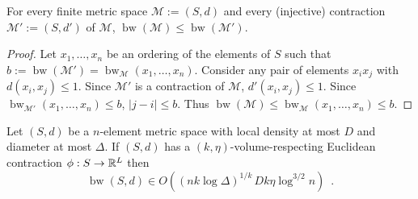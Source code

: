 \documentclass{patmorin}
\renewcommand{\ge}{\geqslant}
\renewcommand{\le}{\leqslant}
\newcommand{\david}[1]{{\color{orange} David: #1}}
\newcommand{\pat}[1]{\textcolor{Blue}{Pat: #1}}
\DeclareMathOperator{\bw}{bw}
\begin{document}

\begin{obs}\label{contraction_increases_bandwidth}
  For every finite metric space $\mathcal{M}:=(S,d)$ and every (injective) contraction $\mathcal{M}':=(S,d')$ of $\mathcal{M}$, $\bw(\mathcal{M}) \le \bw(\mathcal{M}')$.
\end{obs}

\begin{proof}
  Let $x_1,\ldots,x_n$ be an ordering of the elements of $S$ such that $b:=\bw(\mathcal{M}')=\bw_{\mathcal{M}}(x_1,\ldots,x_n)$. Consider any pair of elements $x_ix_j$ with $d(x_i,x_j) \le 1$. Since $\mathcal{M}'$ is a contraction of $\mathcal{M}$, $d'(x_i,x_j)\le 1$.  Since $\bw_{\mathcal{M}'}(x_1,\ldots,x_n)\le b$, $|j-i|\le b$.  Thus $\bw(\mathcal{M})\le \bw_{\mathcal{M}}(x_1,\ldots,x_n)\le b$.
\end{proof}




\begin{thm}\label{volume_density_bandwidth}
  Let $(S,d)$ be a $n$-element metric space with local density at most $D$ and diameter at most $\Delta$.  If $(S,d)$ has a $(k,\eta)$-volume-respecting Euclidean contraction $\phi:S\to\mathbb{R}^L$
  then
  \[
    \bw(S,d) \in O((nk\log\Delta)^{1/k}\,Dk\eta\log^{3/2} n) \enspace .
  \]
\end{thm}
\end{document}

